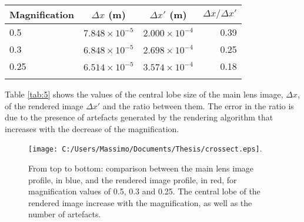 \begin{center}
\begin{tabular}{l|c|c|r}
\centering
Magnification & $\Delta x$ (m)& $\Delta x'$ (m) & $\Delta x/\Delta x'$\\ \hline
0.5 & $7.848 \times 10^{-5}$ &  $2.000 \times 10^{-4}$ & 0.39\\ \hline
0.3 & $6.848 \times 10^{-5}$ &  $2.698 \times 10^{-4}$ & 0.25 \\ \hline
0.25 & $6.514\times 10^{-5}$ &  $3.574 \times 10^{-4}$ & 0.18 \\ 
\label{tab:5}
\end{tabular}
\end{center} 
Table \ref{tab:5} shows the values of the central lobe size of the main lens image, $\Delta x$, of the rendered image $\Delta x'$ and the ratio between them. The error in the ratio is due to the presence of artefacts generated by the rendering algorithm that increases with the decrease of the magnification.
\begin{figure}[H]
	\centering
	\texttt{[image: C:/Users/Massimo/Documents/Thesis/crossect.eps]}.
	\caption{\label{fig:prof05} From top to bottom: comparison between the main lens image profile, in blue, and the rendered image profile, in red, for magnification values of 0.5, 0.3 and 0.25. The central lobe of the rendered image increase with the magnification, as well as the number of artefacts. }
\end{figure}
